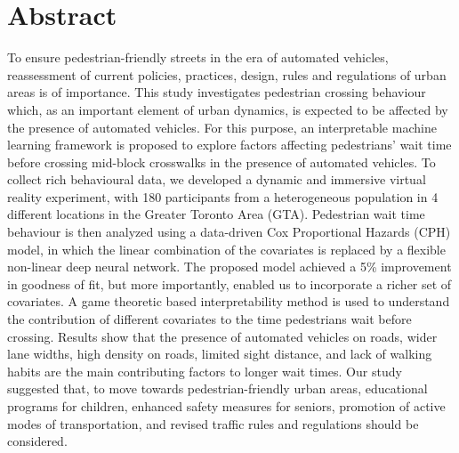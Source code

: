 \section*{Abstract}
To ensure pedestrian-friendly streets in the era of automated vehicles, reassessment of current policies, practices, design, rules and regulations of urban areas is of importance. This study investigates pedestrian crossing behaviour which, as an important element of urban dynamics,
 is expected to be affected by the presence of automated vehicles. For this purpose, an interpretable machine learning framework is proposed to explore factors affecting pedestrians' wait time before crossing mid-block crosswalks in the presence of automated vehicles.
To collect rich behavioural data, we developed a dynamic and immersive virtual reality experiment, with 180 participants from a heterogeneous population in 4 different locations in the Greater Toronto Area (GTA). 
Pedestrian wait time behaviour is then analyzed using a data-driven Cox Proportional Hazards (CPH) model, in which the linear combination of the covariates is replaced by a flexible non-linear deep neural network.
The proposed model achieved a 5\% improvement in goodness of fit, but more importantly, enabled us to incorporate a richer set of covariates.
A game theoretic based interpretability method is used to understand the contribution of different covariates to the time pedestrians wait before crossing.
Results show that the presence of automated vehicles on roads, wider lane widths, high density on roads, limited sight distance, and lack of walking habits are the main contributing factors to longer wait times. Our study suggested that, to move towards pedestrian-friendly urban areas, educational programs for children, enhanced safety measures for seniors, promotion of active modes of transportation, and revised traffic rules and regulations should be considered.
\clearpage














